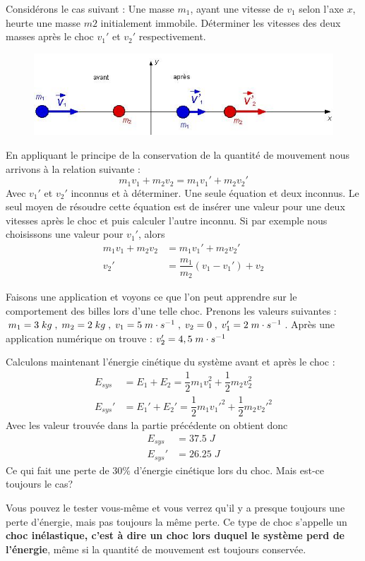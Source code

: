 \documentclass[11pt,a4paper]{article}
\begin{document}
Considérons le cas suivant : Une masse $m_1$, ayant une vitesse de $v_1$ selon l'axe $x$, heurte une masse $m2$ initialement immobile. Déterminer les vitesses des deux masses après le choc $v_1'$ et $v_2'$ respectivement. 
\begin{figure}[h]
    \centering
    \includegraphics[width=0.8\linewidth]{imgs/p2/choc1.jpg}
\end{figure}
En appliquant le principe de la conservation de la quantité de mouvement nous arrivons à la relation suivante : 
\[   m_1v_1 + m_2v_2 = m_1v_1' + m_2v_2'     \]
Avec $v_1'$ et $v_2'$ inconnus et à déterminer. Une seule équation et deux inconnus. Le seul moyen de résoudre cette équation est de insérer une valeur pour une deux vitesses après le choc et puis calculer l'autre inconnu. Si par exemple nous choisissons une valeur pour $v_1'$, alors 
\begin{align*}
    m_1v_1 + m_2v_2 &= m_1v_1' + m_2v_2' \\
    v_2' &= \dfrac{m_1}{m_2}(v_1 - v_1') + v_2
\end{align*}

Faisons une application et voyons ce que l'on peut apprendre sur le comportement des billes lors d'une telle choc. Prenons les valeurs suivantes : $m_1 = 3\; kg\;,\; m_2=2\; kg\;,\; v_1 = 5\; m\cdot s^{-1} \;,\; v_2=0\;,\; v_1'=2\; m\cdot s^{-1}$. Après une application numérique on trouve : $v_2' = 4,5\; m\cdot s^{-1} $

Calculons maintenant l'énergie cinétique du système avant et après le choc : 
\begin{align*}
    E_{sys} &= E_1 + E_2 = \dfrac{1}{2}m_1v_1^2 + \dfrac{1}{2}m_2v_2^2 \\
    E_{sys}' &= E_1' + E_2' = \dfrac{1}{2}m_1{v_1'}^2 + \dfrac{1}{2}m_2{v_2'}^2 
\end{align*}
Avec les valeur trouvée dans la partie précédente on obtient donc 
\begin{align*}
    E_{sys} &= 37.5\; J \\
    E_{sys}' &= 26.25\; J 
\end{align*}
Ce qui fait une perte de $30 \%$ d'énergie cinétique lors du choc. Mais est-ce toujours le cas? 

Vous pouvez le tester vous-même et vous verrez qu'il y a presque toujours une perte d'énergie, mais pas toujours la même perte. Ce type de choc s'appelle un \textbf{choc inélastique, c'est à dire un choc lors duquel le système perd de l'énergie}, même si la quantité de mouvement est toujours conservée. 
\end{document}
